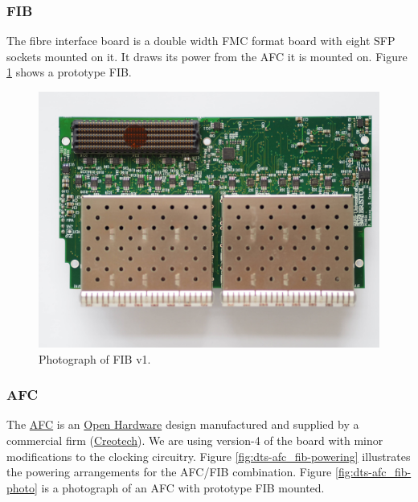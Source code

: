 \documentclass[fleqn,12pt,a4paper]{olplainarticle}
\begin{document}
\subsubsection{FIB}

The fibre interface board is a double width FMC format board with eight SFP sockets mounted on it. It draws its power from the AFC it is mounted on. Figure \ref{fig:dts-fib-photo} shows a prototype FIB.

\begin{figure}
  \centering
  \includegraphics[width=\linewidth]{P7230002.JPG}
  \caption{Photograph of FIB v1.}
  \label{fig:dts-fib-photo}
\end{figure}

\subsubsection{AFC}

The \href{https://ohwr.org/project/afc/wikis/home}{AFC} is an \href{https://ohwr.org}{Open Hardware} design manufactured and supplied by a commercial firm  (\href{https://creotech.pl/}{Creotech}). We are using version-4 of the board with minor modifications to the clocking circuitry. Figure \ref{fig:dts-afc_fib-powering} illustrates the powering arrangements for the AFC/FIB combination. Figure \ref{fig:dts-afc_fib-photo} is a photograph of an AFC with prototype FIB mounted.
\end{document}
